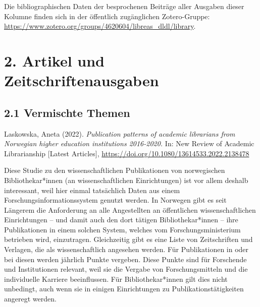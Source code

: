 \documentclass[a4paper,
fontsize=11pt,
oneside,
numbers=noperiodatend,
parskip=half-,
bibliography=totoc,
final
]{scrartcl}
\begin{document}
Die bibliographischen Daten der besprochenen Beiträge aller Ausgaben
dieser Kolumne finden sich in der öffentlich zugänglichen Zotero-Gruppe:
\url{https://www.zotero.org/groups/4620604/libreas_dldl/library}.

\hypertarget{artikel-und-zeitschriftenausgaben}{%
\section{2. Artikel und
Zeitschriftenausgaben}\label{artikel-und-zeitschriftenausgaben}}

\hypertarget{vermischte-themen}{%
\subsection{2.1 Vermischte Themen}\label{vermischte-themen}}

Laskowska, Aneta (2022). \emph{Publication patterns of academic
librarians from Norwegian higher education institutions 2016-2020.} In:
New Review of Academic Librarianship {[}Latest Articles{]},
\url{https://doi.org/10.1080/13614533.2022.2138478}

Diese Studie zu den wissenschaftlichen Publikationen von norwegischen
Bibliothekar*innen (an wissenschaftlichen Einrichtungen) ist vor allem
deshalb interessant, weil hier einmal tatsächlich Daten aus einem
Forschungsinformationssystem genutzt werden. In Norwegen gibt es seit
Längerem die Anforderung an alle Angestellten an öffentlichen
wissenschaftlichen Einrichtungen -- und damit auch den dort tätigen
Bibliothekar*innen -- ihre Publikationen in einem solchen System,
welches vom Forschungsministerium betrieben wird, einzutragen.
Gleichzeitig gibt es eine Liste von Zeitschriften und Verlagen, die als
wissenschaftlich angesehen werden. Für Publikationen in oder bei diesen
werden jährlich Punkte vergeben. Diese Punkte sind für Forschende und
Institutionen relevant, weil sie die Vergabe von Forschungsmitteln und
die individuelle Karriere beeinflussen. Für Bibliothekar*innen gilt dies
nicht unbedingt, auch wenn sie in einigen Einrichtungen zu
Publikationstätigkeiten angeregt werden.
\end{document}
